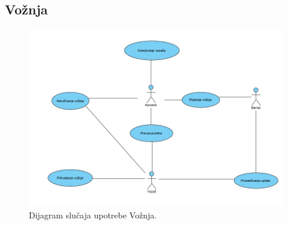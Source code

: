 \subsection{\bfseries Vožnja}
\begin{figure}[H]
\begin{center}
\includegraphics[width=\textwidth]{Slike/VoznjaUseCase.png}
\end{center}
    \caption{Dijagram slučaja upotrebe Vožnja.}
\label{fig:Vožnja}
\end{figure}

